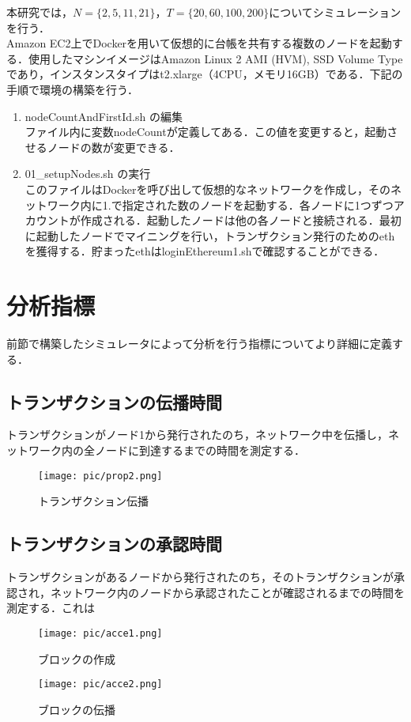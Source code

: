 \documentclass[japanese, macos]{KU2}
\begin{document}
本研究では，$N = \{2,5,11,21\}$，$T = \{20,60,100,200\}$についてシミュレーションを行う．\\
Amazon EC2上でDockerを用いて仮想的に台帳を共有する複数のノードを起動する．使用したマシンイメージはAmazon Linux 2 AMI (HVM), SSD Volume Typeであり，インスタンスタイプはt2.xlarge（4CPU，メモリ16GB）である．下記の手順で環境の構築を行う．
\begin{enumerate}
\item nodeCountAndFirstId.sh の編集\\
ファイル内に変数nodeCountが定義してある．この値を変更すると，起動させるノードの数が変更できる．
\item 01\_setupNodes.sh の実行\\
このファイルはDockerを呼び出して仮想的なネットワークを作成し，そのネットワーク内に1.で指定された数のノードを起動する．各ノードに1つずつアカウントが作成される．起動したノードは他の各ノードと接続される．最初に起動したノードでマイニングを行い，トランザクション発行のためのethを獲得する．貯まったethはloginEthereum1.shで確認することができる．
\end{enumerate}

\section{分析指標}
前節で構築したシミュレータによって分析を行う指標についてより詳細に定義する．\\
\subsection{トランザクションの伝播時間}
トランザクションがノード1から発行されたのち，ネットワーク中を伝播し，ネットワーク内の全ノードに到達するまでの時間を測定する．
\begin{figure}[htbp]
  \begin{center}
   \texttt{[image: pic/prop2.png]}
    \caption{トランザクション伝播}
    \label{fig:prop2} 
  \end{center}
\end{figure}
\subsection{トランザクションの承認時間}
トランザクションがあるノードから発行されたのち，そのトランザクションが承認され，ネットワーク内のノードから承認されたことが確認されるまでの時間を測定する．これは

\begin{figure}[htbp]
 \begin{minipage}{0.5\hsize}
  \begin{center}
   \texttt{[image: pic/acce1.png]}
    \caption{ブロックの作成}
    \label{fig:prop1} 
  \end{center}
 \end{minipage}
 \begin{minipage}{0.5\hsize}
  \begin{center}
   \texttt{[image: pic/acce2.png]}
    \caption{ブロックの伝播}
    \label{fig:prop2} 
  \end{center}
 \end{minipage}
\end{figure}
\end{document}
